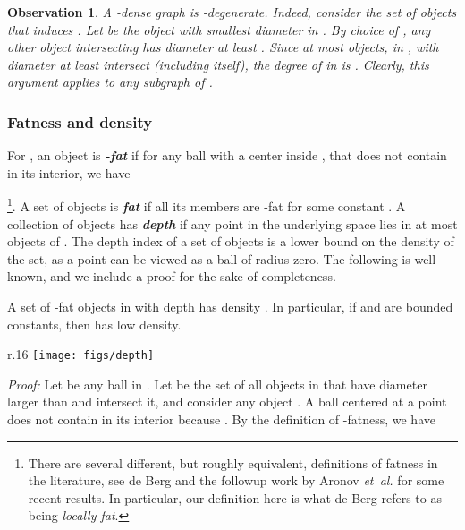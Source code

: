 \documentclass[12pt]{article}
\newcommand{\etal}{\textit{et~al.}\xspace}
\newcommand{\emphic}[2]{\textcolor{blue25}{\textbf{\emph{#1}}}\index{#2}}
\renewcommand{\emphic}[2]{\textbf{\emph{#1}}}
\newcommand{\emphi}[1]{\emphic{#1}{#1}}
\newtheorem{observation}[theorem]{Observation}
\theoremstyle{remark}\theoremheaderfont{\sf}\theorembodyfont{\upshape}
\numberwithin{figure}{section}\numberwithin{table}{section}\numberwithin{equation}{section}
\newcommand{\obslab}[1]{\label{observation:#1}}
\newcommand{\si}[1]{#1}
\begin{document}
\begin{observation}
  \obslab{low:density:g:sparse}A -dense graph  is
  -degenerate. Indeed, consider the set of objects
   that induces . Let  be the object with
  smallest diameter  in . By choice of , any other
  object intersecting  has diameter at least . Since at
  most  objects, in , with diameter at least 
  intersect  (including  itself), the degree of  in
   is . Clearly, this argument applies to any
  subgraph of .
\end{observation}


\subsubsection{Fatness and density}
For , an object  is
\emphi{-fat} if for any ball  with a center inside
, that does not contain  in its interior, we have

\cite{bksv-rimga-02}\footnote{There are several different, but roughly equivalent,
  definitions of fatness in the literature, see \si{de} Berg
  \cite{b-ibucf-08} and the followup work by Aronov \etal
  \cite{abes-ibulf-14} for some recent results. In particular, our
  definition here is what \si{de} Berg refers to as being
  \emph{locally fat}.}. A set  of objects is \emphi{fat} if
all its members are -fat for some constant .  A
collection of objects  has \emphi{depth}  if any point in
the underlying space lies in at most  objects of . The
depth index of a set of objects is a lower bound on the density of the
set, as a point can be viewed as a ball of radius zero. The following
is well known, and we include a proof for the sake of completeness.


\begin{lemma}
  A set  of -fat objects in  with depth 
  has density . In particular, if 
  and  are bounded constants, then  has low density.
\end{lemma}

\begin{wrapfigure}{r}{.16\textwidth}
  \vspace{-2em}
  \hfill\texttt{[image: figs/depth]}
  \vspace{-2em}
\end{wrapfigure}
\noindent\textit{Proof:}
Let  be any ball in .  Let 
be the set of all objects in  that have diameter larger than
 and intersect it, and consider any object
.  A ball  centered at a point
 does not contain  in its interior
because .  By the
definition of -fatness, we have
\end{document}
